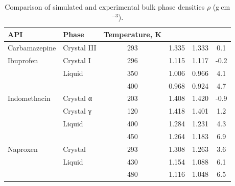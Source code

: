 	\begin{table}[h!]
		\centering
		\begin{tabular}{llcccc}
			\hline
			\textbf{API} & \textbf{Phase} & \textbf{Temperature, K} & \boldmath{$\rho_\textbf{MD}$} & \boldmath{$\rho_\textbf{exp}$} & \boldmath{$100(\rho_\textbf{MD}/\rho_\textbf{exp}^{−1})$} \\ \toprule
			Carbamazepine     & Crystal III    & 293                    & 1.335                                 & 1.333                                 & 0.1                                 \\ \midrule
			Ibuprofen         & Crystal I      & 296                    & 1.115                                 & 1.117                                 & -0.2                                \\ 
			& Liquid         & 350                    & 1.006                                 & 0.966                                 & 4.1                                 \\ 
			&                & 400                    & 0.968                                 & 0.924                                 & 4.7                                 \\ \midrule
			Indomethacin      & Crystal α      & 203                    & 1.408                                 & 1.420                                 & -0.9                                \\
			& Crystal γ      & 120                    & 1.418                                 & 1.401                                 & 1.2                                 \\ 
			& Liquid         & 400                    & 1.284                                 & 1.231                                 & 4.3                                 \\ 
			&                & 450                    & 1.264                                 & 1.183                                 & 6.9                                 \\ \midrule
			Naproxen          & Crystal        & 293                    & 1.308                                 & 1.263                                 & 3.6                                 \\ 
			& Liquid         & 430                    & 1.154                                 & 1.088                                 & 6.1                                 \\ 
			&                & 480                    & 1.116                                 & 1.048                                 & 6.5                                 \\ \bottomrule
		\end{tabular}
		\caption{Comparison of simulated and experimental bulk phase densities $\rho$ (g$\ $cm$^{-3}$).}
		\label{tab:densities}
		\vspace{-0.5cm}
	\end{table}

